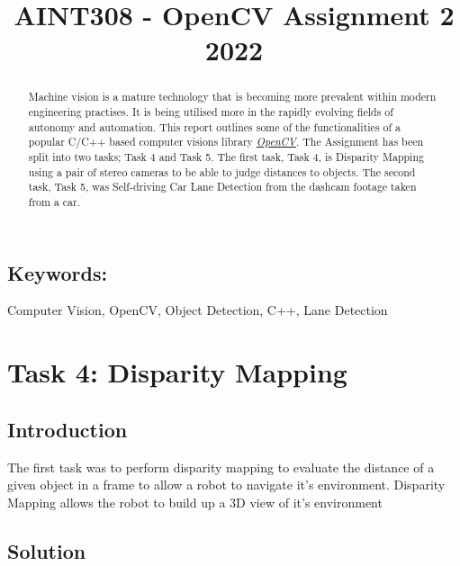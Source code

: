 \documentclass[conference]{IEEEtran}
\begin{document}
\title{AINT308 - OpenCV Assignment 2 2022}

\author{
}

\maketitle

\begin{abstract}

Machine vision is a mature technology that is becoming more prevalent within modern engineering practises. It is being utilised more in the rapidly evolving fields of autonomy and automation. This report outlines some of the functionalities of a popular C/C++ based computer visions library \href{https://opencv.org}{\textit{OpenCV}}. The Assignment has been split into two tasks; Task 4 and Task 5. The first task, Task 4, is Disparity Mapping using a pair of stereo cameras to be able to judge distances to objects. The second task, Task 5, was Self-driving Car Lane Detection from the dashcam footage taken from a car.

\end{abstract}

\subsection*{Keywords:} 
Computer Vision, OpenCV, Object Detection, C++, Lane Detection

\section{Task 4: Disparity Mapping}	
\subsection{Introduction}

The first task was to perform disparity mapping to evaluate the distance of a given object in a frame to allow a robot to navigate it's environment. Disparity Mapping allows the robot to build up a 3D view of it's environment  

\subsection{Solution}
\end{document}
